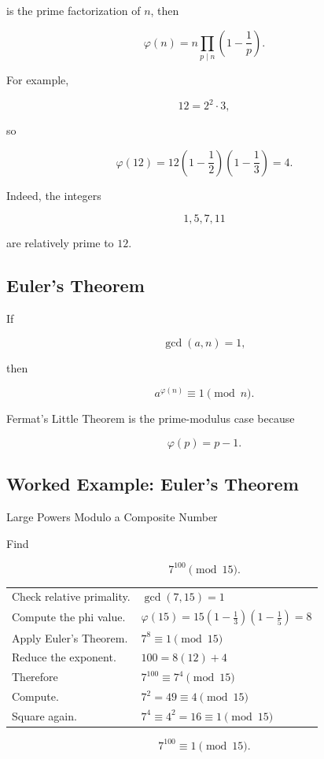 is the prime factorization of \(n\), then

\[ \boxed{\varphi(n)=n\prod_{p\mid n}\left(1-\frac1p\right).} \]

For example,

\[ 12=2^2\cdot3, \]

so

\[ \varphi(12)=12\left(1-\frac12\right)\left(1-\frac13\right)=4. \]

Indeed, the integers

\[ 1,5,7,11 \]

are relatively prime to \(12\).

\subsection{Euler's Theorem}
\label{subsec:eulers-theorem-number-theory}

\begin{theorem}
If

\[ \gcd(a,n)=1, \]

then

\[ a^{\varphi(n)}\equiv1\pmod n. \]
\end{theorem}

Fermat's Little Theorem is the prime-modulus case because

\[ \varphi(p)=p-1. \]

\subsection{Worked Example: Euler's Theorem}
\label{subsec:worked-eulers-theorem}

\begin{workedexamplebox}{Large Powers Modulo a Composite Number}

Find

\[ 7^{100}\pmod{15}. \]

\begin{tabularx}{\textwidth}{@{}>{\raggedright\arraybackslash}p{}X@{}}
Check relative primality. &
\(\gcd(7,15)=1\)\\
Compute the phi value. &
\(\varphi(15)=15(1-\frac13)(1-\frac15)=8\)\\
Apply Euler's Theorem. &
\(7^8\equiv1\pmod{15}\)\\
Reduce the exponent. &
\(100=8(12)+4\)\\
Therefore &
\(7^{100}\equiv7^4\pmod{15}\)\\
Compute. &
\(7^2=49\equiv4\pmod{15}\)\\
Square again. &
\(7^4\equiv4^2=16\equiv1\pmod{15}\)
\end{tabularx}

\begin{answerbox}
\[ \boxed{7^{100}\equiv1\pmod{15}.} \]
\end{answerbox}
\end{workedexamplebox}

